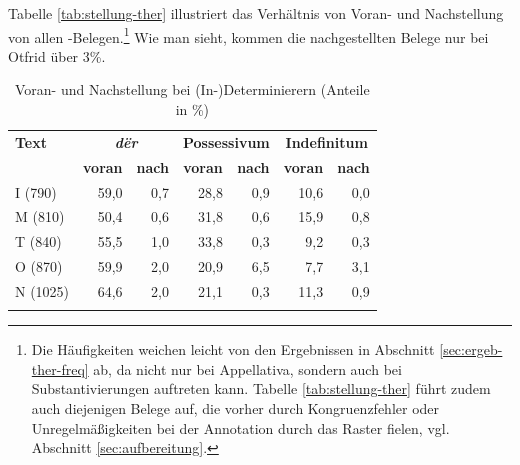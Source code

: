 Tabelle \ref{tab:stellung-ther} illustriert das Verhältnis von Voran- und Nachstellung von allen -Belegen.\footnote{Die Häufigkeiten weichen leicht von den Ergebnissen in Abschnitt \ref{sec:ergeb-ther-freq} ab, da  nicht nur bei Appellativa, sondern auch bei Substantivierungen auftreten kann. Tabelle \ref{tab:stellung-ther} führt zudem auch diejenigen Belege auf, die vorher durch Kongruenzfehler oder Unregelmäßigkeiten bei der Annotation durch das Raster fielen, vgl. Abschnitt \ref{sec:aufbereitung}.} Wie man sieht, kommen die nachgestellten Belege nur bei Otfrid über 3\%. 

\begin{table}
\centering
\begin{tabular}{lrrrrrr}
\lsptoprule
                      \textbf{Text} & \multicolumn{2}{c}{\textit{\textbf{dër}}}                             & \multicolumn{2}{c}{\textbf{Possessivum}}                               & \multicolumn{2}{c}{\textbf{Indefinitum}}    \\ 
\textbf{}              & \multicolumn{1}{c}{\textbf{voran}} & \multicolumn{1}{c}{\textbf{nach}} & \multicolumn{1}{c}{\textbf{voran}} & \multicolumn{1}{c}{\textbf{nach}} & \multicolumn{1}{c}{\textbf{voran}} & \multicolumn{1}{c}{\textbf{nach}} \\ \midrule
I (790)           & 59,0                              & 0,7                              & 28,8                              & 0,9                              & 10,6                              & 0,0                              \\
M (810) & 50,4                              & 0,6                              & 31,8                              & 0,6                              & 15,9                              & 0,8                              \\
T (840)           & 55,5                              & 1,0                              & 33,8                              & 0,3                              & 9,2                               & 0,3                              \\
O (870)           & 59,9                              & 2,0                              & 20,9                              & 6,5                              & 7,7                               & 3,1                              \\
N (1025)          & 64,6                              & 2,0                              & 21,1                              & 0,3                              & 11,3                              & 0,9                              \\ \lspbottomrule
\end{tabular}
\caption{Voran- und Nachstellung bei (In-)Determinierern (Anteile in \%)}
\label{tab:stellung-det}
\end{table}

